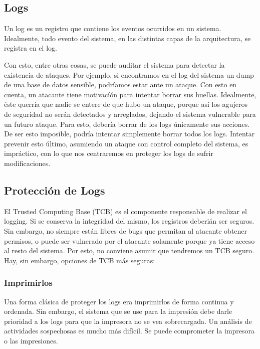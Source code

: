 \subsection{Logs}

Un log es un registro que contiene los eventos ocurridos en un sistema.
Idealmente, todo evento del sistema, en las distintas capas de la arquitectura, se registra en el log.

Con esto, entre otras cosas, se puede auditar el sistema para detectar la existencia de ataques. Por ejemplo, si encontramos en el log del sistema un dump de una base de datos sensible, podríamos estar ante un ataque.
Con esto en cuenta, un atacante tiene motivacíón para intentar borrar sus huellas. Idealmente, éste querría que nadie se entere de que hubo un ataque, porque así los agujeros de seguridad no serán detectados y arreglados, dejando el sistema vulnerable para un futuro ataque. Para esto, debería borrar de los logs únicamente sus acciones. De ser esto imposible, podría intentar simplemente borrar todos los logs. Intentar prevenir esto último, asumiendo un ataque con control completo del sistema, es impráctico, con lo que nos centraremos en proteger los logs de sufrir modificaciones.

\subsection{Protección de Logs}

El Trusted Computing Base (TCB) es el componente responsable de realizar el logging. 
Si se conserva la integridad del mismo, los registros deberián ser seguros. 
Sin embargo, no siempre están libres de bugs que permitan al atacante obtener permisos, o puede ser vulnerado por el atacante solamente porque ya tiene acceso al resto del sistema. Por esto, no conviene asumir que tendremos un TCB seguro.
Hay, sin embargo, opciones de TCB más seguras:

\subsubsection{Imprimirlos}

Una forma clásica de proteger los logs era imprimirlos de forma continua y ordenada. Sin embargo, el sistema que se use para la impresión debe darle prioridad a los logs para que la impresora no se vea sobrecargada.
Un análisis de actividades sospechosas es mucho más difícil.
Se puede comprometer la impresora o las impresiones.


